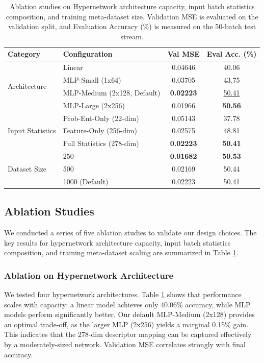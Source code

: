 \documentclass{article}
\theoremstyle{plain}
\theoremstyle{definition}
\theoremstyle{remark}
\begin{document}
\begin{table}[t]
\caption{Ablation studies on Hypernetwork architecture capacity, input batch statistics composition, and training meta-dataset size. Validation MSE is evaluated on the validation split, and Evaluation Accuracy (\%) is measured on the 50-batch test stream.}
\label{tab:ablations_combined}
\vskip 0.15in
\begin{center}
\begin{small}
\begin{sc}
\begin{tabular}{llcc}
\toprule
Category & Configuration & Val MSE & Eval Acc. (\%) \\
\midrule
\multirow{4}{*}{Architecture} & Linear & 0.04646 & 40.06 \\
 & MLP-Small (1x64) & 0.03705 & 43.75 \\
 & MLP-Medium (2x128, Default) & \textbf{0.02223} & \underline{50.41} \\
 & MLP-Large (2x256) & 0.01966 & \textbf{50.56} \\
\midrule
\multirow{3}{*}{Input Statistics} & Prob-Ent-Only (22-dim) & 0.05143 & 37.78 \\
 & Feature-Only (256-dim) & 0.02575 & 48.81 \\
 & Full Statistics (278-dim) & \textbf{0.02223} & \textbf{50.41} \\
\midrule
\multirow{3}{*}{Dataset Size} & 250 & \textbf{0.01682} & \textbf{50.53} \\
 & 500 & 0.02169 & 50.44 \\
 & 1000 (Default) & 0.02223 & 50.41 \\
\bottomrule
\end{tabular}
\end{sc}
\end{small}
\end{center}
\vskip -0.1in
\end{table}

\subsection{Ablation Studies}

We conducted a series of five ablation studies to validate our design choices. The key results for hypernetwork architecture capacity, input batch statistics composition, and training meta-dataset scaling are summarized in Table \ref{tab:ablations_combined}.

\subsubsection{Ablation on Hypernetwork Architecture}
We tested four hypernetwork architectures. Table \ref{tab:ablations_combined} shows that performance scales with capacity: a linear model achieves only 40.06\% accuracy, while MLP models perform significantly better. Our default MLP-Medium (2x128) provides an optimal trade-off, as the larger MLP (2x256) yields a marginal 0.15\% gain. This indicates that the 278-dim descriptor mapping can be captured effectively by a moderately-sized network. Validation MSE correlates strongly with final accuracy.
\end{document}
